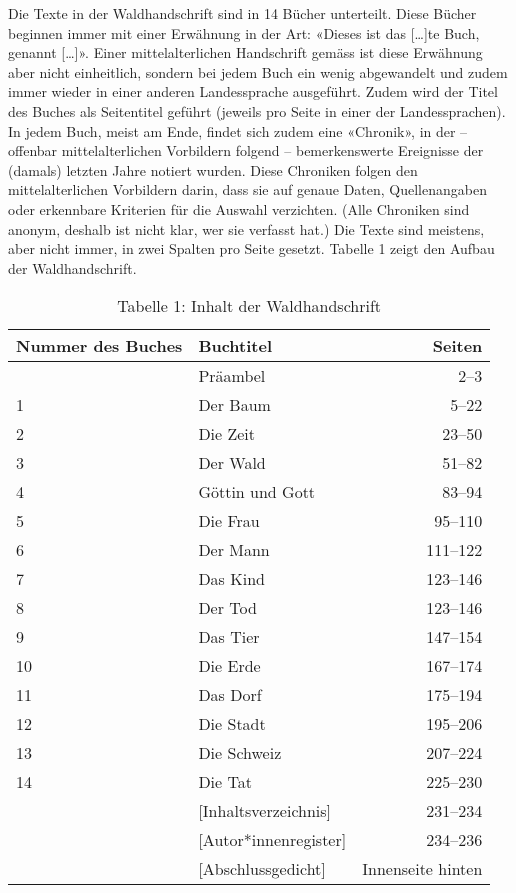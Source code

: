 \documentclass[a4paper,
fontsize=11pt,
oneside,
numbers=noperiodatend,
parskip=half-,
bibliography=totoc,
final
]{scrartcl}
\begin{document}
Die Texte in der Waldhandschrift sind in 14 Bücher unterteilt. Diese
Bücher beginnen immer mit einer Erwähnung in der Art: «Dieses ist das
{[}\ldots{]}te Buch, genannt {[}\ldots{]}». Einer mittelalterlichen
Handschrift gemäss ist diese Erwähnung aber nicht einheitlich, sondern
bei jedem Buch ein wenig abgewandelt und zudem immer wieder in einer
anderen Landessprache ausgeführt. Zudem wird der Titel des Buches als
Seitentitel geführt (jeweils pro Seite in einer der Landessprachen). In
jedem Buch, meist am Ende, findet sich zudem eine «Chronik», in der --
offenbar mittelalterlichen Vorbildern folgend -- bemerkenswerte
Ereignisse der (damals) letzten Jahre notiert wurden. Diese Chroniken
folgen den mittelalterlichen Vorbildern darin, dass sie auf genaue
Daten, Quellenangaben oder erkennbare Kriterien für die Auswahl
verzichten. (Alle Chroniken sind anonym, deshalb ist nicht klar, wer sie
verfasst hat.) Die Texte sind meistens, aber nicht immer, in zwei
Spalten pro Seite gesetzt. Tabelle 1 zeigt den Aufbau der
Waldhandschrift.

\begin{table}
\centering
    \begin{tabular}{llr}
\toprule
\textbf{Nummer des Buches} & \textbf{Buchtitel} & \textbf{Seiten} \\
\midrule
& Präambel & 2--3 \\
1 & Der Baum & 5--22 \\
2 & Die Zeit & 23--50 \\
3 & Der Wald & 51--82 \\
4 & Göttin und Gott & 83--94 \\
5 & Die Frau & 95--110 \\
6 & Der Mann & 111--122 \\
7 & Das Kind & 123--146 \\
8 & Der Tod & 123--146 \\
9 & Das Tier & 147--154 \\
10 & Die Erde & 167--174 \\
11 & Das Dorf & 175--194 \\
12 & Die Stadt & 195--206 \\
13 & Die Schweiz & 207--224 \\
14 & Die Tat & 225--230 \\
& {[}Inhaltsverzeichnis{]} & 231--234 \\
& {[}Autor*innenregister{]} & 234--236 \\
& {[}Abschlussgedicht{]} & Innenseite hinten \\
\bottomrule
\end{tabular}
\caption{Tabelle 1: Inhalt der Waldhandschrift}\
\end{table}
\end{document}
